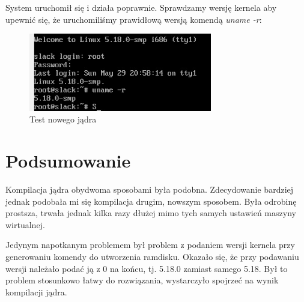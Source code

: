 \documentclass[12pt]{article}
\begin{document}
System uruchomił się i działa poprawnie. Sprawdzamy wersję kernela aby upewnić się, że uruchomiliśmy prawidłową wersją komendą \textit{uname -r}:

\begin{figure}[H]
\centering
\includegraphics[width=8cm]{newkernelwtf.jpg}
\caption{Test nowego jądra}
\end{figure}

\section{Podsumowanie}

Kompilacja jądra obydwoma sposobami była podobna. Zdecydowanie bardziej jednak podobała mi się kompilacja drugim, nowszym sposobem. Była odrobinę prostsza, trwała jednak kilka razy dłużej mimo tych samych ustawień maszyny wirtualnej.

Jedynym napotkanym problemem był problem z podaniem wersji kernela przy generowaniu komendy do utworzenia ramdisku. Okazało się, że przy podawaniu wersji należało podać ją z 0 na końcu, tj. 5.18.0 zamiast samego 5.18. Był to problem stosunkowo łatwy do rozwiązania, wystarczyło spojrzeć na wynik kompilacji jądra.
\end{document}
